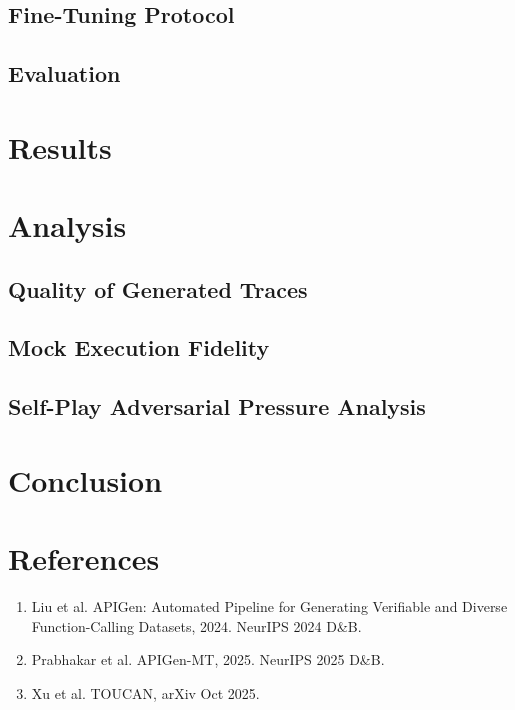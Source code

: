 \documentclass{article}
\begin{document}
\subsection{Fine-Tuning Protocol}
\subsection{Evaluation}

\section{Results}

\section{Analysis}
\subsection{Quality of Generated Traces}
\subsection{Mock Execution Fidelity}
\subsection{Self-Play Adversarial Pressure Analysis}

\section{Conclusion}

\section*{References}
\small
\begin{enumerate}
    \item Liu et al. APIGen: Automated Pipeline for Generating Verifiable and Diverse Function-Calling Datasets, 2024. NeurIPS 2024 D\&B.
    \item Prabhakar et al. APIGen-MT, 2025. NeurIPS 2025 D\&B.
    \item Xu et al. TOUCAN, arXiv Oct 2025.
\end{enumerate}
\end{document}
